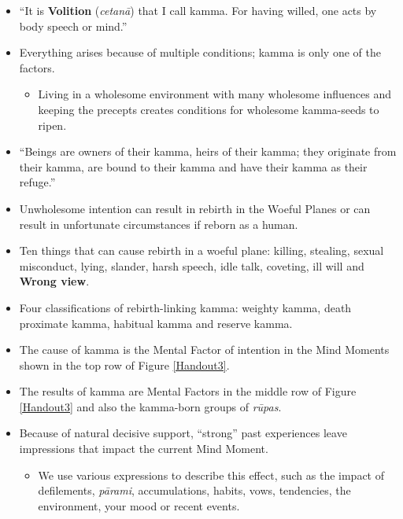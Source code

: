 \begin{itemize}

\item “It is \textbf{Volition} (\textit{cetanā}) that I call kamma. For having willed, one acts by body speech or mind.”

\item Everything arises because of multiple conditions; kamma is only one of the factors.

\begin{itemize}

\item Living in a wholesome environment with many wholesome influences and keeping the precepts creates conditions for wholesome kamma-seeds to ripen.

\end{itemize}

\item “Beings are owners of their kamma, heirs of their kamma; they originate from their kamma, are bound to their kamma and have their kamma as their refuge.”

\item Unwholesome intention can result in rebirth in the Woeful Planes or can result in unfortunate circumstances if reborn as a human.

\item Ten things that can cause rebirth in a woeful plane: killing, stealing, sexual misconduct, lying, slander, harsh speech, idle talk, coveting, ill will and \textbf{Wrong view}.

\item Four classifications of rebirth-linking kamma: weighty kamma, death proximate kamma, habitual kamma and reserve kamma.

\item The cause of kamma is the Mental Factor of intention in the Mind Moments shown in the top row of Figure \ref{Handout3}.

\item The results of kamma are Mental Factors in the middle row of Figure \ref{Handout3} and also the kamma-born groups of \textit{rūpas}.

\item Because of natural decisive support, “strong” past experiences leave impressions that impact the current Mind Moment.

\begin{itemize}

\item We use various expressions to describe this effect, such as the impact of defilements, \textit{pārami}, accumulations, habits, vows, tendencies, the environment, your mood or recent events.


\end{itemize}
\end{itemize}
